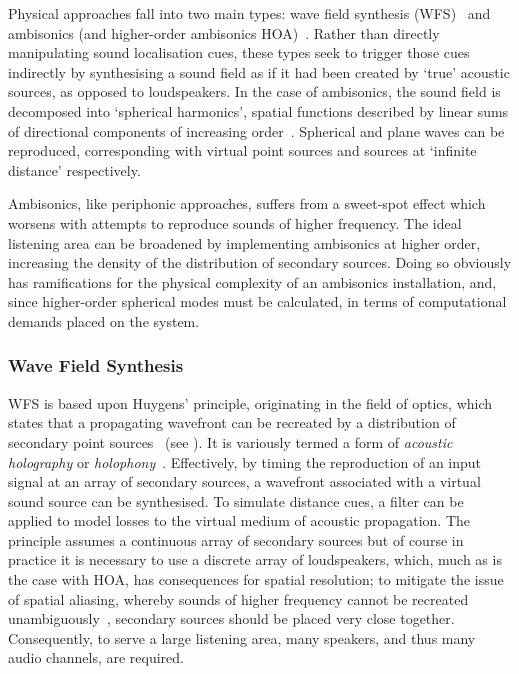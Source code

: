 Physical approaches fall into two main types: wave field synthesis
(WFS)~\citep{berkhout_acoustic_1993} and
ambisonics (and higher-order ambisonics \textemdash{}
HOA)~\citep{frank_producing_2015}.
Rather than directly manipulating sound localisation cues, these types seek to
trigger those cues indirectly by synthesising a sound field as if it had been
created by `true' acoustic sources, as opposed to loudspeakers.
In the case of ambisonics, the sound field is decomposed into `spherical
harmonics', spatial functions described by linear sums of directional
components of increasing order~\citep{nicol_sound_2017}.
Spherical and plane waves can be reproduced, corresponding with virtual
point sources and sources at `infinite distance' respectively.

Ambisonics, like periphonic approaches, suffers from a sweet-spot effect which
worsens with attempts to reproduce sounds of higher frequency.
The ideal listening area can be broadened by implementing ambisonics at higher
order, increasing the density of the distribution of secondary sources.
Doing so obviously has ramifications for the physical complexity of an
ambisonics installation, and, since higher-order spherical modes must be
calculated, in terms of computational demands placed on the system.

\subsubsection{Wave Field Synthesis}

WFS is based upon Huygens' principle, originating in the field of optics, which
states that a propagating wavefront can be recreated by a distribution of
secondary point sources~\citep{mueller_acoustic_1971,berkhout_acoustic_1993,
    belloch_performance_2021} (see ).
It is variously termed a form of \textit{acoustic holography} or
\textit{holophony}~\citep{berkhout_holographic_1988,ahrens_analytic_2012}.
Effectively, by timing the reproduction of an input signal at an array of
secondary sources, a wavefront associated with a virtual sound source can be
synthesised.
To simulate distance cues, a filter can be applied to model losses to the
virtual medium of acoustic propagation.
The principle assumes a continuous array of secondary sources but of course in
practice it is necessary to use a discrete array of loudspeakers, which,
much as is the case with HOA, has consequences for spatial resolution;
to mitigate the issue of spatial aliasing, whereby sounds of higher frequency
cannot be recreated unambiguously~\citep{winter_geometric_2018}, secondary
sources should be placed very close together.
Consequently, to serve a large listening area, many speakers, and thus many
audio channels, are required.

